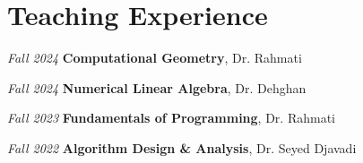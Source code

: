 


\section{Teaching Experience} 
\begin{twocolentry}{
		\textit{Fall 2024}}
	\textbf{Computational Geometry}, Dr. Rahmati
\end{twocolentry}
\begin{twocolentry}{
		\textit{Fall 2024}}
	\textbf{Numerical Linear Algebra}, Dr. Dehghan
\end{twocolentry}
\begin{twocolentry}{
		\textit{Fall 2023}}
	\textbf{Fundamentals of Programming}, Dr. Rahmati
\end{twocolentry}
\begin{twocolentry}{
		\textit{Fall 2022}}
	\textbf{Algorithm Design \& Analysis}, Dr. Seyed Djavadi
\end{twocolentry}
